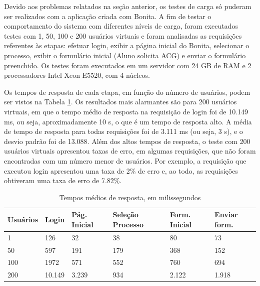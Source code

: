 \documentclass[12pt]{article}
\begin{document}
Devido aos problemas relatados na seção anterior, os testes de carga só puderam ser realizados com a aplicação criada com Bonita. A fim de testar o comportamento do sistema com diferentes níveis de carga, foram executados testes com 1, 50, 100 e 200 usuários virtuais e foram analisadas as requisições referentes às etapas: efetuar login, exibir a página inicial do Bonita, selecionar o processo, exibir o formulário inicial (Aluno solicita ACG) e enviar o formulário preenchido. Os testes foram executados em um servidor com 24 GB de RAM e 2 processadores Intel Xeon E5520, com 4 núcleos. 





Os tempos de resposta de cada etapa, em função do número de usuários, podem ser vistos na Tabela \ref{tab:resultadoCarga}. Os resultados mais alarmantes são para 200 usuários virtuais, em que o tempo médio de resposta na requisição de login foi de 10.149 ms, ou seja, aproximadamente 10 s, o que é um tempo de resposta alto. A média de tempo de resposta para todas requisições foi de 3.111 ms (ou seja, 3 s), e o desvio padrão foi de 13.088. Além dos altos tempos de resposta, o teste com 200 usuários virtuais apresentou taxas de erro, em algumas requisições, que não foram encontradas com um número menor de usuários. Por exemplo, a requisição que executou login apresentou uma taxa de 2\% de erro e, ao todo, as requisições obtiveram uma taxa de erro de 7.82\%.

\begin{table}
{\scriptsize
\centering
\begin{tabular}{p{2cm}|p{2cm}|p{2cm}|p{2cm}|p{2cm}|p{2cm}}
\hline
Usuários & Login & Pág. Inicial & Seleção Processo & Form. Inicial & Enviar form. \\\hline
1 & 126 & 32 & 38 & 80 & 73\\\hline
50 & 597 & 191 & 179 & 368 & 152\\\hline
100 & 1972 & 571 & 552 & 760 & 694\\\hline
200 & 10.149 & 3.239 & 934 & 2.122 & 1.918\\\hline
\end{tabular}
}
\caption{Tempos médios de resposta, em milissegundos}
\label{tab:resultadoCarga}
\end{table}
\end{document}
